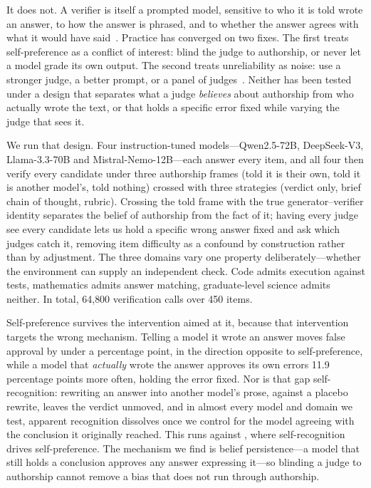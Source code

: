 \documentclass{article}
\begin{document}
It does not. A verifier is itself a prompted model, sensitive to who it is told wrote an
answer, to how the answer is phrased, and to whether the answer agrees with what it would
have said~\citep{zheng2023judging,wang2023fair,panickssery2024llm}. Practice has converged
on two fixes. The first treats self-preference as a conflict of interest: blind the judge
to authorship, or never let a model grade its own output. The second treats unreliability
as noise: use a stronger judge, a better prompt, or a panel of
judges~\citep{verga2024replacing}. Neither has been tested under a design that separates
what a judge \emph{believes} about authorship from who actually wrote the text, or that
holds a specific error fixed while varying the judge that sees it.

We run that design. Four instruction-tuned models---Qwen2.5-72B, DeepSeek-V3,
Llama-3.3-70B and Mistral-Nemo-12B---each answer every item, and all four then verify
every candidate under three authorship frames (told it is their own, told it is another
model's, told nothing) crossed with three strategies (verdict only, brief chain of
thought, rubric). Crossing the told frame with the true generator--verifier identity
separates the belief of authorship from the fact of it; having every judge see every
candidate lets us hold a specific wrong answer fixed and ask which judges catch it,
removing item difficulty as a confound by construction rather than by adjustment. The
three domains vary one property deliberately---whether the environment can supply an
independent check. Code admits execution against tests, mathematics admits answer
matching, graduate-level science admits neither. In total, 64{,}800 verification calls
over 450 items.

Self-preference survives the intervention aimed at it, because that intervention targets
the wrong mechanism. Telling a model it wrote an answer moves false approval by under a
percentage point, in the direction opposite to self-preference, while a model that
\emph{actually} wrote the answer approves its own errors 11.9 percentage points more often, holding
the error fixed. Nor is that gap self-recognition: rewriting an answer into another
model's prose, against a placebo rewrite, leaves the verdict unmoved, and in almost every
model and domain we test, apparent recognition dissolves once we control for the model
agreeing with the conclusion it originally reached. This runs against
\citet{panickssery2024llm}, where self-recognition drives self-preference. The mechanism we
find is belief persistence---a model that still holds a conclusion approves any answer
expressing it---so blinding a judge to authorship cannot remove a bias that does not run
through authorship.
\end{document}
